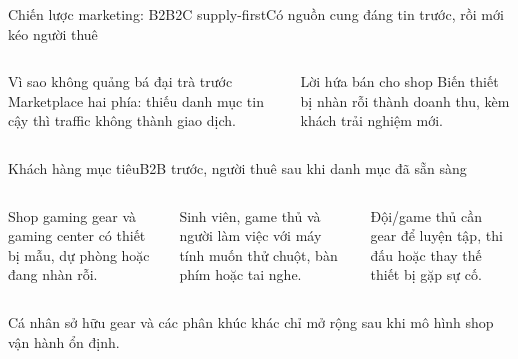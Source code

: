 \begin{frame}{Chiến lược marketing: B2B2C supply-first}{Có nguồn cung đáng tin trước, rồi mới kéo người thuê}
  \vspace{1.1em}
  \centering
  \vfill
  \begin{columns}[T,onlytextwidth]
      \begin{block}{Vì sao không quảng bá đại trà trước}
        Marketplace hai phía: thiếu danh mục tin cậy thì traffic không thành giao dịch.
      \end{block}
      \begin{exampleblock}{Lời hứa bán cho shop}
        Biến thiết bị nhàn rỗi thành doanh thu, kèm khách trải nghiệm mới.
      \end{exampleblock}
  \end{columns}
\end{frame}

\begin{frame}{Khách hàng mục tiêu}{B2B trước, người thuê sau khi danh mục đã sẵn sàng}
  \vspace{.8em}
  \begin{columns}[T,onlytextwidth]
      \par\vspace{.45em}
      Shop gaming gear và gaming center có thiết bị mẫu, dự phòng hoặc đang nhàn rỗi.
      \par\vspace{.45em}
      Sinh viên, game thủ và người làm việc với máy tính muốn thử chuột, bàn phím hoặc tai nghe.
      \par\vspace{.45em}
      Đội/game thủ cần gear để luyện tập, thi đấu hoặc thay thế thiết bị gặp sự cố.
  \end{columns}
  \vfill
  \centering\small\color{cookieMuted}
  Cá nhân sở hữu gear và các phân khúc khác chỉ mở rộng sau khi mô hình shop vận hành ổn định.
\end{frame}


